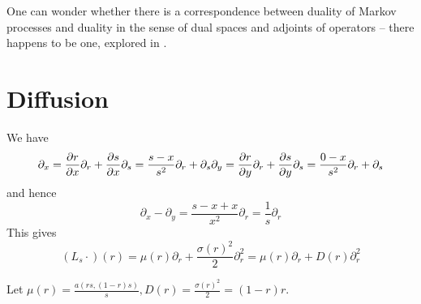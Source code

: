 \documentclass{article}
\begin{document}
One can wonder whether there is a correspondence between duality of Markov processes and duality in the sense of dual spaces and adjoints of operators -- there happens to be one, explored in \cite{jansen2014notion}. %




\section{Diffusion}

We have
\[
\partial_x
= \frac{\partial r}{\partial x}\partial_r + \frac{\partial s}{\partial x}\partial_s
= \frac{s - x}{s^2}\partial_r + \partial_s
\\\partial_y
= \frac{\partial r}{\partial y}\partial_r + \frac{\partial s}{\partial y}\partial_s
= \frac{0 - x}{s^2}\partial_r + \partial_s
\]
and hence
\[
\partial_x - \partial_y
= \frac{s - x + x}{x^2}\partial_r
= \frac{1}{s}\partial_r
\]
This gives
\[
(L_s \cdot)(r)
= \mu(r) \partial_r + \frac{\sigma(r)^2}{2} \partial_r^2
= \mu(r) \partial_r + D(r) \partial_r^2
\]

Let $\mu(r) = \frac{a(rs, (1-r)s)}{s}, D(r) = \frac{\sigma(r)^2}{2}=(1-r)r$.

\end{document}
